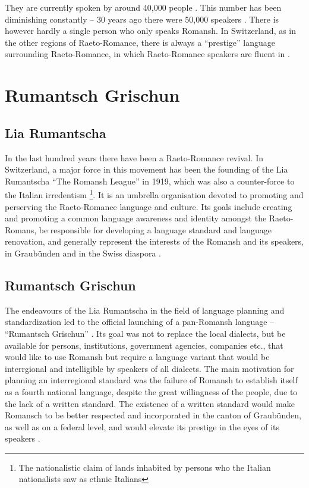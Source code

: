They are currently spoken by around 40,000 people \autocite{bundesamt2020}. 
This number has been diminishing constantly -- 30 years ago there were 50,000 speakers \autocite{haiman1992}. 
There is however hardly a single person who only speaks Romansh. 
In Switzerland, as in the other regions of Raeto-Romance, there is always a \enquote{prestige} language surrounding Raeto-Romance, in which Raeto-Romance speakers are fluent in \autocite[3]{haiman1992}. 

\section{Rumantsch Grischun}
\subsection{Lia Rumantscha}
In the last hundred years there have been a Raeto-Romance revival. 
In Switzerland, a major force in this movement has been the founding of the Lia Rumantscha \enquote{The Romansh League} in 1919, which was also a counter-force to the Italian irredentism \footnote{The nationalistic claim of lands inhabited by persons who the Italian nationalists saw as ethnic Italians}. 
It is an umbrella organisation devoted to promoting and perserving the Raeto-Romance language and culture. Its goals include creating and promoting a common language awareness and identity amongst the Raeto-Romans, be responsible for developing a language standard and language renovation, and generally represent the interests of the Romansh and its speakers, in Graubünden and in the Swiss diaspora \autocite{dazzi2012}.

\subsection{Rumantsch Grischun}
The endeavours of the Lia Rumantscha in the field of language planning and standardization led to the official launching of a pan-Romansh language -- \enquote{Rumantsch Grischun} \autocite[5]{haiman1992}. 
Its goal was not to replace the local dialects, but be available for persons, institutions, government agencies, companies etc., that would like to use Romansh but require a language variant that would be interrgional and intelligible by speakers of all dialects. The main motivation for planning an interregional standard was the failure of Romansh to establish itself as a fourth national language, despite the great willingness of the people, due to the lack of a written standard. 
The existence of a written standard would make Romansch to be better respected and incorporated in the canton of Graubünden, as well as on a federal level, and would elevate its prestige in the eyes of its speakers \autocite{schmid1982}.

